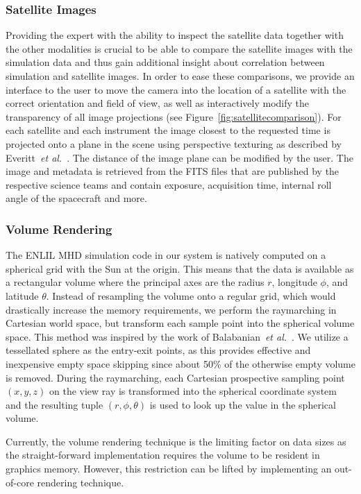 \documentclass[journal]{vgtc}                %
\def\etal{\textit{et al.}}
\begin{document}
\subsubsection{Satellite Images} \label{sec:satelltes}
Providing the expert with the ability to inspect the satellite data together with the other modalities is crucial to be able to compare the satellite images with the simulation data and thus gain additional insight about correlation between simulation and satellite images. In order to ease these comparisons, we provide an interface to the user to move the camera into the location of a satellite with the correct orientation and field of view, as well as interactively modify the transparency of all image projections (see Figure~\ref{fig:satellitecomparison}). For each satellite and each instrument the image closest to the requested time is projected onto a plane in the scene using perspective texturing as described by Everitt~\etal~\cite{Everitt:2001tg}. The distance of the image plane can be modified by the user. The image and metadata is retrieved from the FITS files that are published by the respective science teams and contain exposure, acquisition time, internal roll angle of the spacecraft and more.

\subsubsection{Volume Rendering} \label{sec:volumerendering}
The ENLIL MHD simulation code in our system is natively computed on a spherical grid with the Sun at the origin. This means that the data is available as a rectangular volume where the principal axes are the radius $r$, longitude $\phi$, and latitude $\theta$. Instead of resampling the volume onto a regular grid, which would drastically increase the memory requirements, we perform the raymarching in Cartesian world space, but transform each sample point into the spherical volume space. This method was inspired by the work of Balabanian~\etal ~\cite{balabanian-2007-ant}. We utilize a tessellated sphere as the entry-exit points, as this provides effective and inexpensive empty space skipping since about 50\% of the otherwise empty volume is removed. During the raymarching, each Cartesian prospective sampling point $(x,y,z)$ on the view ray is transformed into the spherical coordinate system and the resulting tuple $(r, \phi, \theta)$ is used to look up the value in the spherical volume.

Currently, the volume rendering technique is the limiting factor on data sizes as the straight-forward implementation requires the volume to be resident in graphics memory. However, this restriction can be lifted by implementing an out-of-core rendering technique.
\end{document}
